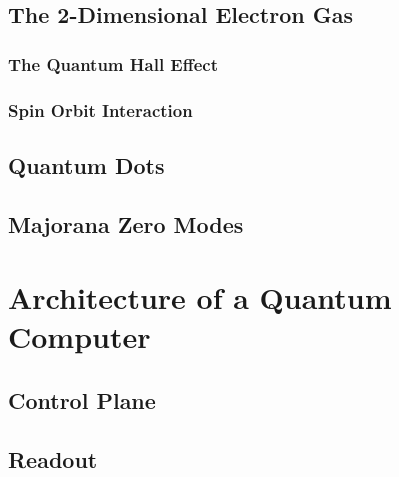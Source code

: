 \subsection{The 2-Dimensional Electron Gas}
\subsubsection{The Quantum Hall Effect}
\subsubsection{Spin Orbit Interaction}
\subsection{Quantum Dots}
\subsection{Majorana Zero Modes}

\section{Architecture of a Quantum Computer}
\label{sec:arch}
  \subsection{Control Plane}
  \subsection{Readout}